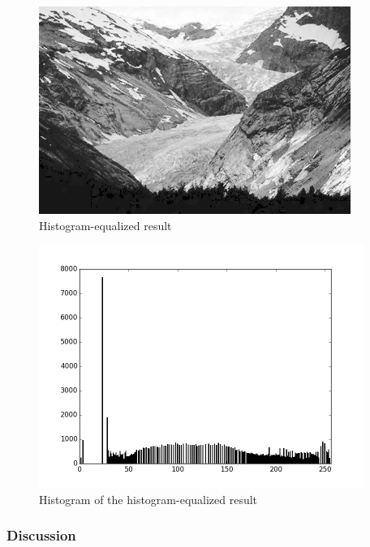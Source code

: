 \documentclass{article}
\begin{document}
\begin{figure}[H]
	\centering
	\includegraphics[width=288pt]{../result/equalize.png}
	\caption{Histogram-equalized result}
\end{figure}

\begin{figure}[H]
	\centering
	\includegraphics[width=300pt]{../result/hist-equalize.png}
	\caption{Histogram of the histogram-equalized result}
\end{figure}

\subsubsection{Discussion}

\end{document}
